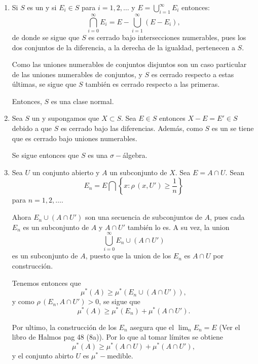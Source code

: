 \documentclass[letterpaper,12pt]{article} %
\begin{document}
\begin{enumerate}
    \item%
        Si $S$ es un \sring y si $E_i\in S$ para $i=1,2,\dots$
        y $E=\bigcup_{i=1}^\infty E_i$ entonces:
        \[
            \bigcap_{i=0}^\infty E_i = E - \bigcup_{i=1}^\infty (E-E_i),
        \]
        de donde se sigue que $S$ es cerrado bajo intersecciones numerables,
        pues los dos conjuntos de la diferencia, a la derecha de la igualdad,
        pertenecen a $S$.

        Como las uniones numerables de conjuntos disjuntos son un caso
        particular de las uniones numerables de conjuntos, y $S$ es cerrado
        respecto a estas últimas, se sigue que $S$ también es cerrado respecto
        a las primeras.

        Entonces, $S$ es una clase normal.

    \item%
        Sea $S$ un \sring y supongamos que $X\subset S$. Sea $E\in S$ entonces
        $X-E=E'\in S$ debido a que $S$ es cerrado bajo las diferencias.
        Además, como $S$ es un \sring se tiene que es cerrado bajo uniones numerables.

        Se sigue entonces que $S$ es una $\sigma -$álgebra.

    \item%
        Sea $U$ un conjunto abierto y $A$ un subconjunto de $X$. Sea $E=A\cap U$. Sean
        \[
            E_n = E \bigcap \left\{x\colon \rho\,(x, U')\geq\dfrac{1}{n}\right\}
        \]
        para $n=1,2,\dots$.

        Ahora $E_n \cup (A\cap U')$ son una secuencia de subconjuntos de $A$, pues cada
        $E_n$ es un subconjunto de $A$ y $A\cap U'$ también lo es. A su vez, la union
        \[
            \bigcup_{i=0}^\infty E_n \cup (A\cap U')
        \]
        es un subconjunto de $A$, puesto que la union de los $E_n$ es $A\cap U$ por construcción.

        Tenemos entonces que
        \[
            \mu^*(A)\geq\mu^*(E_n \cup (A\cap U')),
        \]
        y como $\rho\,(E_n, A\cap U')>0$, se sigue que
        \[
            \mu^*(A)\geq\mu^*(E_n)+\mu^*(A\cap U').
        \]

        Por ultimo, la construcción de los $E_n$ asegura que el $\lim_n E_n = E$
        (Ver el libro de Halmos pag 48 (8a)). Por lo que al tomar límites se obtiene
        \[
            \mu^*(A)\geq\mu^*(A\cap U)+\mu^*(A\cap U'),
        \]
        y el conjunto abirto $U$ es $\mu^*-$medible.
\end{enumerate}
\end{document}
